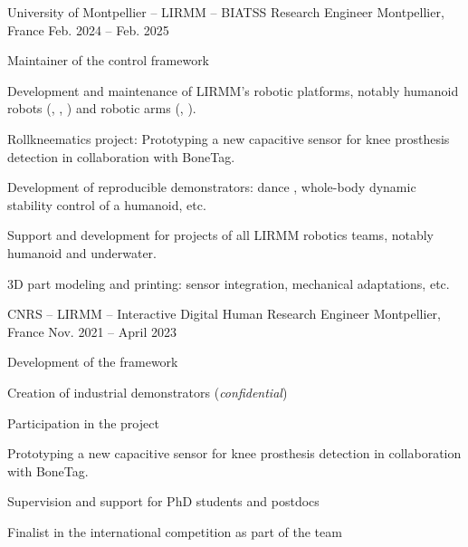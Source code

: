 
\begin{cventries}
  \cventry
  {University of Montpellier -- LIRMM -- BIATSS} %
  {Research Engineer} %
  {Montpellier, France} %
  {Feb. 2024 -- Feb. 2025} %
  {
    \begin{cvitems} %
    \item Maintainer of the control framework 
    \item Development and maintenance of LIRMM's robotic platforms, notably humanoid robots
      (, , ) and robotic
      arms (, ).
    \item Rollkneematics project: Prototyping a new capacitive sensor for knee prosthesis detection in
      collaboration with BoneTag.
    \item Development of reproducible demonstrators: dance , whole-body
      dynamic stability control of a humanoid, etc.
    \item Support and development for projects of all LIRMM robotics teams, notably humanoid and underwater.
    \item 3D part modeling and printing: sensor integration, mechanical adaptations, etc.
    \end{cvitems}
  }
  \cventry
  {CNRS -- LIRMM -- Interactive Digital Human} %
  {Research Engineer} %
  {Montpellier, France} %
  {Nov. 2021 -- April 2023} %
  {
    \begin{cvitems} %
    \item Development of the  framework
    \item Creation of industrial demonstrators (\emph{confidential})
    \item Participation in the  project
    \item Prototyping a new capacitive sensor for knee prosthesis detection in collaboration with BoneTag.
    \item Supervision and support for PhD students and postdocs
    \item Finalist in the international competition  as part of the
       team
    \end{cvitems}
  }


\end{cventries}
